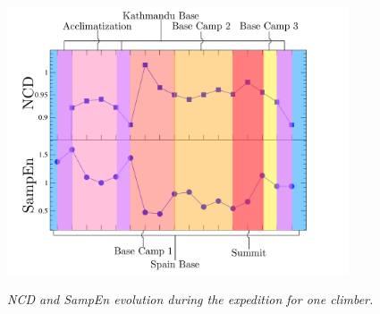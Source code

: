 \begin{figure}[t]
  \begin{center}
    \includegraphics[width=0.9\textwidth]{./figs/Fig1_ST}\\[-0.1cm]
  \end{center}
  \caption{\emph{\small NCD and SampEn evolution during the expedition for one climber.}}
\end{figure}




